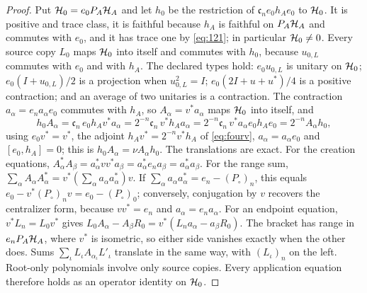 \begin{proof}
Put $\mathcal H_0=e_0P_A\mathcal H_A$ and let $h_0$ be the restriction of $\mathfrak c_ne_0h_Ae_0$ to $\mathcal H_0$. It is positive and trace class, it is faithful because $h_A$ is faithful on $P_A\mathcal H_A$ and commutes with $e_0$, and it has trace one by \eqref{eq:121}; in particular $\mathcal H_0\ne0$. Every source copy $L_0$ maps $\mathcal H_0$ into itself and commutes with $h_0$, because $u_{0,L}$ commutes with $e_0$ and with $h_A$. The declared types hold: $e_0u_{0,L}$ is unitary on $\mathcal H_0$; $e_0(I+u_{0,L})/2$ is a projection when $u_{0,L}^2=I$; $e_0(2I+u+u^*)/4$ is a positive contraction; and an average of two unitaries is a contraction. The contraction $a_\alpha=e_na_\alpha e_0$ commutes with $h_A$, so $A_\alpha=v^*a_\alpha$ maps $\mathcal H_0$ into itself, and
\[
 h_0A_\alpha=\mathfrak c_n\,e_0h_Av^*a_\alpha=2^{-n}\mathfrak c_n\,v^*h_Aa_\alpha=2^{-n}\mathfrak c_n\,v^*a_\alpha e_0h_Ae_0=2^{-n}A_\alpha h_0,
\]
using $e_0v^*=v^*$, the adjoint $h_Av^*=2^{-n}v^*h_A$ of \eqref{eq:fourv}, $a_\alpha=a_\alpha e_0$ and $[e_0,h_A]=0$; this is $h_0A_\alpha=\nu A_\alpha h_0$. The translations are exact. For the creation equations, $A_\alpha^*A_\beta=a_\alpha^*vv^*a_\beta=a_\alpha^*e_na_\beta=a_\alpha^*a_\beta$. For the range sum, $\sum_\alpha A_\alpha A_\alpha^*=v^*(\sum_\alpha a_\alpha a_\alpha^*)v$. If $\sum_\alpha a_\alpha a_\alpha^*=e_n-(P_\circ)_n$, this equals $e_0-v^*(P_\circ)_nv=e_0-(P_\circ)_0$; conversely, conjugation by $v$ recovers the centralizer form, because $vv^*=e_n$ and $a_\alpha=e_na_\alpha$. For an endpoint equation, $v^*L_n=L_0v^*$ gives $L_0A_\alpha-A_\beta R_0=v^*(L_na_\alpha-a_\beta R_0)$. The bracket has range in $e_nP_A\mathcal H_A$, where $v^*$ is isometric, so either side vanishes exactly when the other does. Sums $\sum_\iota L_\iota A_{\alpha_\iota}L'_\iota$ translate in the same way, with $(L_\iota)_n$ on the left. Root-only polynomials involve only source copies. Every application equation therefore holds as an operator identity on $\mathcal H_0$.



\end{proof}
